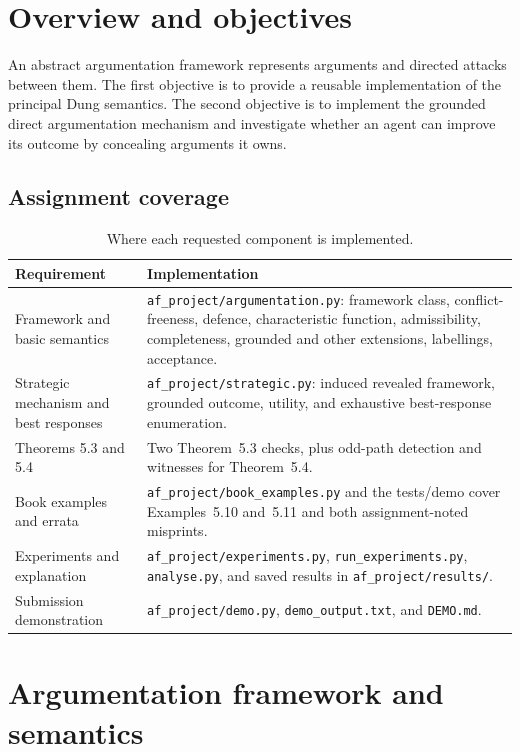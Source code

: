 \documentclass[11pt,a4paper]{article}
\newcommand{\code}[1]{\texttt{\small #1}}
\begin{document}
\tableofcontents
\clearpage
{}

\section{Overview and objectives}

An abstract argumentation framework represents arguments and directed attacks between them. The first objective is to provide a reusable implementation of the principal Dung semantics. The second objective is to implement the grounded direct argumentation mechanism and investigate whether an agent can improve its outcome by concealing arguments it owns.

\subsection{Assignment coverage}
\begin{table}[ht]
\centering
\small
\begin{tabularx}{\textwidth}{@{}p{}X@{}}
\toprule
\textbf{Requirement} & \textbf{Implementation} \\
\midrule
Framework and basic semantics & \code{af\_project/argumentation.py}: framework class, conflict-freeness, defence, characteristic function, admissibility, completeness, grounded and other extensions, labellings, acceptance. \\
Strategic mechanism and best responses & \code{af\_project/strategic.py}: induced revealed framework, grounded outcome, utility, and exhaustive best-response enumeration. \\
Theorems 5.3 and 5.4 & Two Theorem~5.3 checks, plus odd-path detection and witnesses for Theorem~5.4. \\
Book examples and errata & \code{af\_project/book\_examples.py} and the tests/demo cover Examples~5.10 and~5.11 and both assignment-noted misprints. \\
Experiments and explanation & \code{af\_project/experiments.py}, \code{run\_experiments.py}, \code{analyse.py}, and saved results in \code{af\_project/results/}. \\
Submission demonstration & \code{af\_project/demo.py}, \code{demo\_output.txt}, and \code{DEMO.md}. \\
\bottomrule
\end{tabularx}
\caption{Where each requested component is implemented.}
\end{table}

\section{Argumentation framework and semantics}
\end{document}
